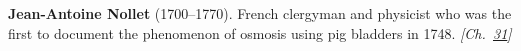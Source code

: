 \textbf{Jean-Antoine Nollet} (1700–1770). French clergyman and physicist who was the first to document the phenomenon of osmosis using pig bladders in 1748. \emph{[Ch.~\hyperref[ch:osmosisdebye]{31}]}

